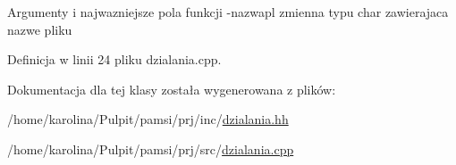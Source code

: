 Argumenty i najwazniejsze pola funkcji -\/nazwapl zmienna typu char zawierajaca nazwe pliku 

Definicja w linii 24 pliku dzialania.\-cpp.



Dokumentacja dla tej klasy została wygenerowana z plików\-:\begin{DoxyCompactItemize}
\item 
/home/karolina/\-Pulpit/pamsi/prj/inc/\hyperlink{dzialania_8hh}{dzialania.\-hh}\item 
/home/karolina/\-Pulpit/pamsi/prj/src/\hyperlink{dzialania_8cpp}{dzialania.\-cpp}\end{DoxyCompactItemize}
